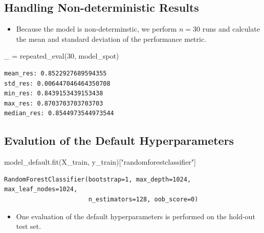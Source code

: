 \documentclass[
  letterpaper,
  DIV=11,
  numbers=noendperiod]{scrreprt}
\newenvironment{Shaded}{\begin{snugshade}}{\end{snugshade}}
\newcommand{\DecValTok}[1]{\textcolor[rgb]{0.68,0.00,0.00}{#1}}
\newcommand{\NormalTok}[1]{\textcolor[rgb]{0.00,0.23,0.31}{#1}}
\newcommand{\OperatorTok}[1]{\textcolor[rgb]{0.37,0.37,0.37}{#1}}
\newcommand{\StringTok}[1]{\textcolor[rgb]{0.13,0.47,0.30}{#1}}
\providecommand{\tightlist}{%
  \setlength{\itemsep}{0pt}\setlength{\parskip}{0pt}}\usepackage{longtable,booktabs,array}
\begin{document}
\hypertarget{handling-non-deterministic-results}{%
\subsection{Handling Non-deterministic
Results}\label{handling-non-deterministic-results}}

\begin{itemize}
\tightlist
\item
  Because the model is non-determinstic, we perform \(n=30\) runs and
  calculate the mean and standard deviation of the performance metric.
\end{itemize}

\begin{Shaded}
\begin{Highlighting}[]
\NormalTok{\_ }\OperatorTok{=}\NormalTok{ repeated\_eval(}\DecValTok{30}\NormalTok{, model\_spot)}
\end{Highlighting}
\end{Shaded}

\begin{verbatim}
mean_res: 0.8522927689594355
std_res: 0.006447046464350708
min_res: 0.8439153439153438
max_res: 0.8703703703703703
median_res: 0.8544973544973544
\end{verbatim}

\hypertarget{evalution-of-the-default-hyperparameters}{%
\subsection{Evalution of the Default
Hyperparameters}\label{evalution-of-the-default-hyperparameters}}

\begin{Shaded}
\begin{Highlighting}[]
\NormalTok{model\_default.fit(X\_train, y\_train)[}\StringTok{"randomforestclassifier"}\NormalTok{]}
\end{Highlighting}
\end{Shaded}

\begin{verbatim}
RandomForestClassifier(bootstrap=1, max_depth=1024, max_leaf_nodes=1024,
                       n_estimators=128, oob_score=0)
\end{verbatim}

\begin{itemize}
\tightlist
\item
  One evaluation of the default hyperparameters is performed on the
  hold-out test set.
\end{itemize}
\end{document}
